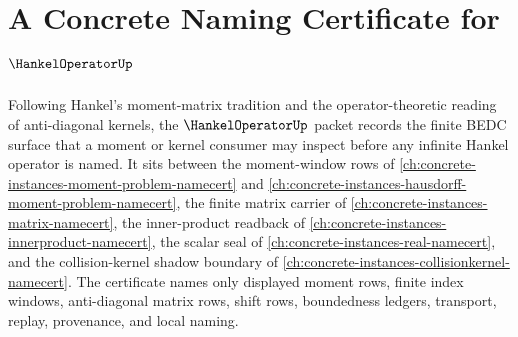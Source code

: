 \chapter{A Concrete Naming Certificate for $\HankelOperatorUp$}
\label{ch:concrete-instances-hankel-operator-namecert}

Following Hankel's moment-matrix tradition and the operator-theoretic reading of anti-diagonal kernels, the $\HankelOperatorUp$ packet records the finite BEDC surface that a moment or kernel consumer may inspect before any infinite Hankel operator is named. It sits between the moment-window rows of \autoref{ch:concrete-instances-moment-problem-namecert} and \autoref{ch:concrete-instances-hausdorff-moment-problem-namecert}, the finite matrix carrier of \autoref{ch:concrete-instances-matrix-namecert}, the inner-product readback of \autoref{ch:concrete-instances-innerproduct-namecert}, the scalar seal of \autoref{ch:concrete-instances-real-namecert}, and the collision-kernel shadow boundary of \autoref{ch:concrete-instances-collisionkernel-namecert}. The certificate names only displayed moment rows, finite index windows, anti-diagonal matrix rows, shift rows, boundedness ledgers, transport, replay, provenance, and local naming.

